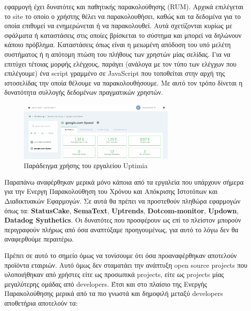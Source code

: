 \begin{itemize}
	      εφαρμογή έχει δυνατότες και παθητικής παρακολούθησης (RUM). Αρχικά επιλέγεται το site το οποίο ο χρήστης θέλει να παρακολουθήσει, καθώς και τα δεδομένα για το οποία επιθυμεί να ενημερώνεται ή να παρακολουθεί.
		  Αυτά σχετίζονται κυρίως με σφάλματα ή καταστάσεις στις οποίες βρίσκεται το σύστημα και μπορεί να δηλώνουν κάποιο πρόβλημα.
		  Καταστάσεις όπως είναι η μειωμένη απόδοση του υπό μελέτη συστήματος ή η απότομη πτώση του πλήθους των χρηστών μίας σελίδας.
	      Για να επιτύχει τέτοιας μορφής ελέγχους, παράγει (ανάλογα με τον τύπο των ελέγχων που επιλέγουμε)
	      ένα script γραμμένο σε JavaScript που τοποθείται στην αρχή της ιστοσελίδας την οποία θέλουμε να παρακολουθήσουμε.
	      Με αυτό τον τρόπο δίνεται η δυνατότητα συλλογής δεδομένων πραγματικών χρηστών.
	      \begin{figure}[!ht]
		      \centering
		      \includegraphics[width=0.7\textwidth]{./images/chapter3/uptimia.png}
		      \caption[Παράδειγμα χρήσης του εργαλείου Uptimia]{Παράδειγμα χρήσης του εργαλείου Uptimia}
		      \label{fig:uptimia}
	      \end{figure}
\end{itemize}

\break

Παραπάνω αναφέρθηκαν μερικά μόνο κάποια από τα εργαλεία που υπάρχουν σήμερα για την Ενεργη Παρακολούθηση του Χρόνου
και Απόκρισης Ιστοτόπων και Διαδικτυακών Εφαρμογών. Σε αυτά θα πρέπει να προστεθούν πληθώρα εφαρμογών όπως τα:
\textbf{StatusCake}, \textbf{SemaText}, \textbf{Uptrends}, \textbf{Dotcom-monitor}, \textbf{Updown}, \textbf{Datadog Synthetics}.
Οι δυνατότες που προσφέρουν ως επί το πλείστον μπορούν περιγραφούν πλήρως από όσα αναπτύξαμε προηγουμένως, για αυτό το λόγω δεν θα αναφερθούμε περαιτέρω.

Πρέπει σε αυτό το σημείο όμως να τονίσουμε ότι όσα προαναφέρθηκαν αποτελούν προϊόντα εταιριών.
Αυτό όμως δεν σταματάει την ανάπτυξη open source projects που υλοποιήθηκαν από χρήστες είτε ως προσωπικά projects, είτε
ως projects μίας μεγαλύτερης ομάδας από developers. Έτσι και στο πλαίσιο της Ενεργής Παρακολούθησης μερικά από τα πιο
γνωστά και δημοφιλή μεταξύ developers αποθετήρια αποτελούν τα:

